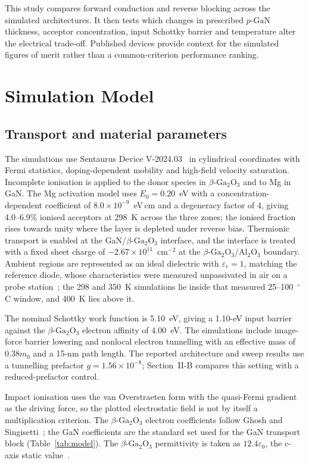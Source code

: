\documentclass[journal,10pt]{IEEEtran}
\newcommand{\GaO}{\ensuremath{\beta\text{-}\mathrm{Ga}_2\mathrm{O}_3}}
\newcommand{\pGaN}{\ensuremath{p\text{-}\mathrm{GaN}}}
\begin{document}
This study compares forward conduction and reverse blocking across the simulated architectures. It then tests which changes in prescribed \pGaN{} thickness, acceptor concentration, input Schottky barrier and temperature alter the electrical trade-off. Published devices provide context for the simulated figures of merit rather than a common-criterion performance ranking.

\section{Simulation Model}
\subsection{Transport and material parameters}
The simulations use Sentaurus Device V-2024.03~\cite{Sentaurus2024} in cylindrical coordinates with Fermi statistics, doping-dependent mobility and high-field velocity saturation. Incomplete ionisation is applied to the donor species in \GaO{} and to Mg in GaN. The Mg activation model uses $E_0=0.20$~eV with a concentration-dependent coefficient of $8.0\times10^{-9}$~eV\,cm and a degeneracy factor of 4, giving 4.0--6.9\% ionised acceptors at 298~K across the three zones; the ionised fraction rises towards unity where the layer is depleted under reverse bias. Thermionic transport is enabled at the GaN/\GaO{} interface, and the interface is treated with a fixed sheet charge of $-2.67\times10^{11}$~cm$^{-2}$ at the \GaO/Al$_2$O$_3$ boundary. Ambient regions are represented as an ideal dielectric with $\varepsilon_r=1$, matching the reference diode, whose characteristics were measured unpassivated in air on a probe station~\cite{Yang2017}; the 298 and 350~K simulations lie inside that measured 25--100~$^\circ$C window, and 400~K lies above it.

The nominal Schottky work function is 5.10~eV, giving a 1.10-eV input barrier against the \GaO{} electron affinity of 4.00~eV. The simulations include image-force barrier lowering and nonlocal electron tunnelling with an effective mass of $0.38m_0$ and a 15-nm path length. The reported architecture and sweep results use a tunnelling prefactor $g=1.56\times10^{-8}$; Section~II-B compares this setting with a reduced-prefactor control.

Impact ionisation uses the van Overstraeten form with the quasi-Fermi gradient as the driving force, so the plotted electrostatic field is not by itself a multiplication criterion. The \GaO{} electron coefficients follow Ghosh and Singisetti~\cite{Ghosh2018_JAP}; the GaN coefficients are the standard set used for the GaN transport block (Table~\ref{tab:model}). The \GaO{} permittivity is taken as $12.4\varepsilon_0$, the c-axis static value~\cite{Fiedler2019_ECS}.
\end{document}
